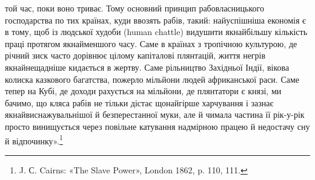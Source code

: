 \parcont{}  %
той час, поки воно триває. Тому основний принцип рабовласницького
господарства по тих країнах, куди ввозять рабів, такий:
найуспішніша економія є в тому, щоб із людської худоби (human
chattle) видушити якнайбільшу кількість праці протягом якнайменшого
часу. Саме в країнах з тропічною культурою, де річний
зиск часто дорівнює цілому капіталові плянтацій, життя негрів
якнайнещадніше кидається в жертву. Саме рільництво Західньої
Індії, вікова колиска казкового багатства, пожерло мільйони
людей африканської раси. Саме тепер на Кубі, де доходи рахується
на мільйони, де плянтатори є князі, ми бачимо, що кляса
рабів не тільки дістає щонайгірше харчування і зазнає якнайвиснажувальнішої
й безперестанної муки, але й чимала частина
її рік-у-рік просто винищується через повільне катування
надмірною працею й недостачу сну й відпочинку».\footnote{
J. С. Cairns: «The Slave Power», London 1862, p. 110, 111.
}


